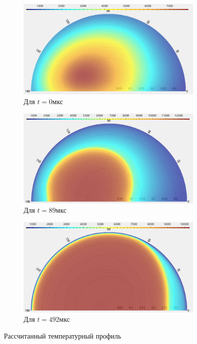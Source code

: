 \begin{figure}
    \centering
    \begin{subfigure}{.5\textwidth}
        \centering
        \includegraphics[width=\linewidth]{img/experiments/complexAsymm/temp-0}
        \caption{Для $t=0$мкс}
    \end{subfigure}%
    \begin{subfigure}{.5\textwidth}
        \centering
        \includegraphics[width=\linewidth]{img/experiments/complexAsymm/temp-89}
        \caption{Для $t=89$мкс}
    \end{subfigure}
    
    \begin{subfigure}{.5\textwidth}
        \centering
        \includegraphics[width=\linewidth]{img/experiments/complexAsymm/temp-492}
        \caption{Для $t=492$мкс}
    \end{subfigure}
    \caption{Рассчитанный температурный профиль}
    \label{fig:comp3t}
\end{figure}

